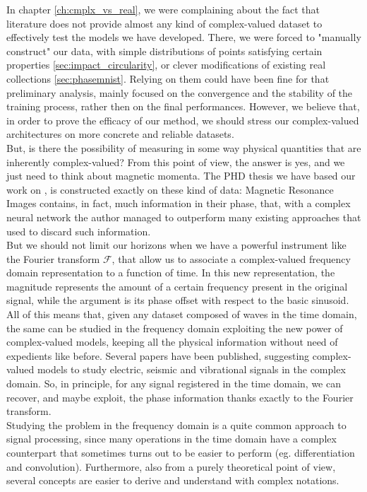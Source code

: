 \documentclass[../main.tex]{subfiles}
\begin{document}
In chapter \ref{ch:cmplx_vs_real}, we were complaining about the fact that literature does not provide almost any kind of complex-valued dataset to effectively test the models we have developed. There, we were forced to "manually construct" our data, with simple distributions of points satisfying certain properties \ref{sec:impact_circularity}, or clever modifications of existing real collections \ref{sec:phasemnist}. Relying on them could have been fine for that preliminary analysis, mainly focused on the convergence and the stability of the training process, rather then on the final performances. However, we believe that, in order to prove the efficacy of our method, we should stress our complex-valued architectures on more concrete and reliable datasets.\\
But, is there the possibility of measuring in some way physical quantities that are inherently complex-valued? From this point of view, the answer is yes, and we just need to think about magnetic momenta. The PHD thesis we have based our work on \cite{Virtue:EECS-2019-126}, is constructed exactly on these kind of data: Magnetic Resonance Images contains, in fact, much information in their phase, that, with a complex neural network the author managed to outperform many existing approaches that used to discard such information.\\
But we should not limit our horizons when we have a powerful instrument like the Fourier transform $\mathcal{F}$, that allow us to associate a complex-valued frequency domain representation to a function of time. In this new representation, the magnitude represents the amount of a certain frequency present in the original signal, while the argument is its phase offset with respect to the basic sinusoid. All of this means that, given any dataset composed of waves in the time domain, the same can be studied in the frequency domain exploiting the new power of complex-valued models, keeping all the physical information without need of expedients like before. Several papers have been published, suggesting complex-valued models to study electric, seismic \cite{Dramsch_seismic} and vibrational signals in the complex domain. So, in principle, for any signal registered in the time domain, we can recover, and maybe exploit, the phase information thanks exactly to the Fourier transform.\\
Studying the problem in the frequency domain is a quite common approach to signal processing, since many operations in the time domain have a complex counterpart that sometimes turns out to be easier to perform (eg. differentiation and convolution). Furthermore, also from a purely theoretical point of view, several concepts are easier to derive and understand with complex notations.
\end{document}
